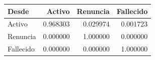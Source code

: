 \begin{tabular}{lrrr}
\toprule
Desde & Activo & Renuncia & Fallecido \\
\midrule
Activo & 0.968303 & 0.029974 & 0.001723 \\
Renuncia & 0.000000 & 1.000000 & 0.000000 \\
Fallecido & 0.000000 & 0.000000 & 1.000000 \\
\bottomrule
\end{tabular}
